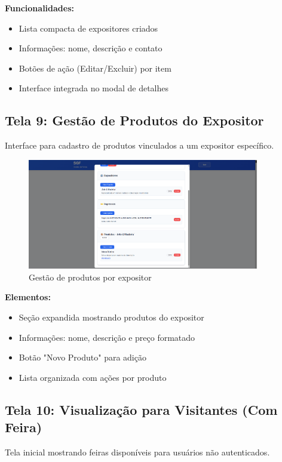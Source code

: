 \documentclass[12pt,a4paper]{article}
\begin{document}
\textbf{Funcionalidades:}
\begin{itemize}
    \item Lista compacta de expositores criados
    \item Informações: nome, descrição e contato
    \item Botões de ação (Editar/Excluir) por item
    \item Interface integrada no modal de detalhes
\end{itemize}

\subsection{Tela 9: Gestão de Produtos do Expositor}

Interface para cadastro de produtos vinculados a um expositor específico.

\begin{figure}[H]
\centering
\includegraphics[width=0.9\textwidth]{wireframes/09_produtos_expositor.png}
\caption{Gestão de produtos por expositor}
\label{fig:gestao_produtos}
\end{figure}

\textbf{Elementos:}
\begin{itemize}
    \item Seção expandida mostrando produtos do expositor
    \item Informações: nome, descrição e preço formatado
    \item Botão "Novo Produto" para adição
    \item Lista organizada com ações por produto
\end{itemize}

\subsection{Tela 10: Visualização para Visitantes (Com Feira)}

Tela inicial mostrando feiras disponíveis para usuários não autenticados.
\end{document}
